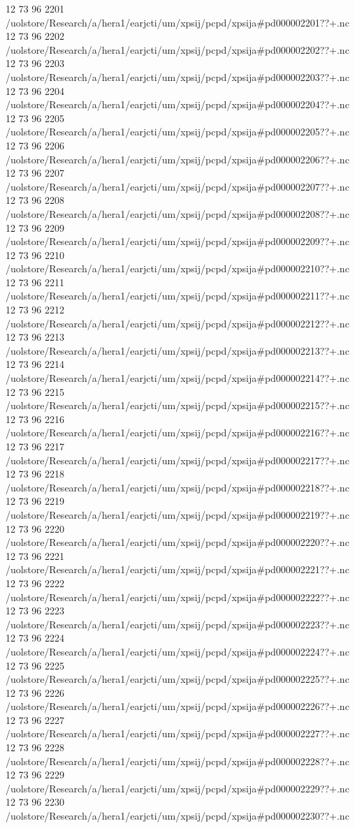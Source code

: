 12 73 96
2201
/uolstore/Research/a/hera1/earjcti/um/xpsij/pcpd/xpsija#pd000002201??+.nc
12 73 96
2202
/uolstore/Research/a/hera1/earjcti/um/xpsij/pcpd/xpsija#pd000002202??+.nc
12 73 96
2203
/uolstore/Research/a/hera1/earjcti/um/xpsij/pcpd/xpsija#pd000002203??+.nc
12 73 96
2204
/uolstore/Research/a/hera1/earjcti/um/xpsij/pcpd/xpsija#pd000002204??+.nc
12 73 96
2205
/uolstore/Research/a/hera1/earjcti/um/xpsij/pcpd/xpsija#pd000002205??+.nc
12 73 96
2206
/uolstore/Research/a/hera1/earjcti/um/xpsij/pcpd/xpsija#pd000002206??+.nc
12 73 96
2207
/uolstore/Research/a/hera1/earjcti/um/xpsij/pcpd/xpsija#pd000002207??+.nc
12 73 96
2208
/uolstore/Research/a/hera1/earjcti/um/xpsij/pcpd/xpsija#pd000002208??+.nc
12 73 96
2209
/uolstore/Research/a/hera1/earjcti/um/xpsij/pcpd/xpsija#pd000002209??+.nc
12 73 96
2210
/uolstore/Research/a/hera1/earjcti/um/xpsij/pcpd/xpsija#pd000002210??+.nc
12 73 96
2211
/uolstore/Research/a/hera1/earjcti/um/xpsij/pcpd/xpsija#pd000002211??+.nc
12 73 96
2212
/uolstore/Research/a/hera1/earjcti/um/xpsij/pcpd/xpsija#pd000002212??+.nc
12 73 96
2213
/uolstore/Research/a/hera1/earjcti/um/xpsij/pcpd/xpsija#pd000002213??+.nc
12 73 96
2214
/uolstore/Research/a/hera1/earjcti/um/xpsij/pcpd/xpsija#pd000002214??+.nc
12 73 96
2215
/uolstore/Research/a/hera1/earjcti/um/xpsij/pcpd/xpsija#pd000002215??+.nc
12 73 96
2216
/uolstore/Research/a/hera1/earjcti/um/xpsij/pcpd/xpsija#pd000002216??+.nc
12 73 96
2217
/uolstore/Research/a/hera1/earjcti/um/xpsij/pcpd/xpsija#pd000002217??+.nc
12 73 96
2218
/uolstore/Research/a/hera1/earjcti/um/xpsij/pcpd/xpsija#pd000002218??+.nc
12 73 96
2219
/uolstore/Research/a/hera1/earjcti/um/xpsij/pcpd/xpsija#pd000002219??+.nc
12 73 96
2220
/uolstore/Research/a/hera1/earjcti/um/xpsij/pcpd/xpsija#pd000002220??+.nc
12 73 96
2221
/uolstore/Research/a/hera1/earjcti/um/xpsij/pcpd/xpsija#pd000002221??+.nc
12 73 96
2222
/uolstore/Research/a/hera1/earjcti/um/xpsij/pcpd/xpsija#pd000002222??+.nc
12 73 96
2223
/uolstore/Research/a/hera1/earjcti/um/xpsij/pcpd/xpsija#pd000002223??+.nc
12 73 96
2224
/uolstore/Research/a/hera1/earjcti/um/xpsij/pcpd/xpsija#pd000002224??+.nc
12 73 96
2225
/uolstore/Research/a/hera1/earjcti/um/xpsij/pcpd/xpsija#pd000002225??+.nc
12 73 96
2226
/uolstore/Research/a/hera1/earjcti/um/xpsij/pcpd/xpsija#pd000002226??+.nc
12 73 96
2227
/uolstore/Research/a/hera1/earjcti/um/xpsij/pcpd/xpsija#pd000002227??+.nc
12 73 96
2228
/uolstore/Research/a/hera1/earjcti/um/xpsij/pcpd/xpsija#pd000002228??+.nc
12 73 96
2229
/uolstore/Research/a/hera1/earjcti/um/xpsij/pcpd/xpsija#pd000002229??+.nc
12 73 96
2230
/uolstore/Research/a/hera1/earjcti/um/xpsij/pcpd/xpsija#pd000002230??+.nc
